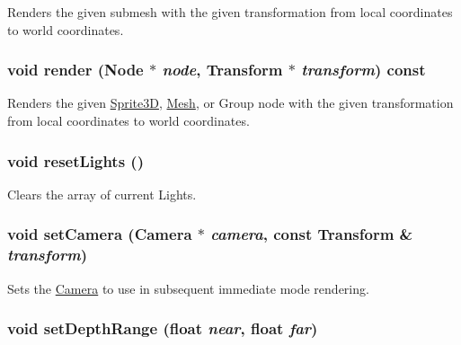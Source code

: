 Renders the given submesh with the given transformation from local coordinates to world coordinates. \hypertarget{classm3g_1_1Graphics3D_9c9ca78b3ce4cc358783a1a2701b9d85}{
\subsubsection[{render}]{\setlength{\rightskip}{0pt plus 5cm}void render ({\bf Node} $\ast$ {\em node}, \/  {\bf Transform} $\ast$ {\em transform}) const}}
\label{classm3g_1_1Graphics3D_9c9ca78b3ce4cc358783a1a2701b9d85}


Renders the given \hyperlink{classm3g_1_1Sprite3D}{Sprite3D}, \hyperlink{classm3g_1_1Mesh}{Mesh}, or Group node with the given transformation from local coordinates to world coordinates. \hypertarget{classm3g_1_1Graphics3D_b8821ec231e8ebd939ae0feaaf138542}{
\subsubsection[{resetLights}]{\setlength{\rightskip}{0pt plus 5cm}void resetLights ()}}
\label{classm3g_1_1Graphics3D_b8821ec231e8ebd939ae0feaaf138542}


Clears the array of current Lights. \hypertarget{classm3g_1_1Graphics3D_0df7bb61cfeba6626e20fd07ddd1c460}{
\subsubsection[{setCamera}]{\setlength{\rightskip}{0pt plus 5cm}void setCamera ({\bf Camera} $\ast$ {\em camera}, \/  const {\bf Transform} \& {\em transform})}}
\label{classm3g_1_1Graphics3D_0df7bb61cfeba6626e20fd07ddd1c460}


Sets the \hyperlink{classm3g_1_1Camera}{Camera} to use in subsequent immediate mode rendering. \hypertarget{classm3g_1_1Graphics3D_6fc3837286f3516aa3320aeec9729495}{
\subsubsection[{setDepthRange}]{\setlength{\rightskip}{0pt plus 5cm}void setDepthRange (float {\em near}, \/  float {\em far})}}
\label{classm3g_1_1Graphics3D_6fc3837286f3516aa3320aeec9729495}


